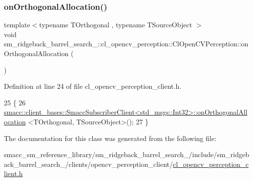 \subsubsection{\texorpdfstring{on\+Orthogonal\+Allocation()}{onOrthogonalAllocation()}}
{\footnotesize\ttfamily template$<$typename T\+Orthogonal , typename T\+Source\+Object $>$ \\
void sm\+\_\+ridgeback\+\_\+barrel\+\_\+search\+\_\+::cl\+\_\+opencv\+\_\+perception\+::\+Cl\+Open\+C\+V\+Perception\+::on\+Orthogonal\+Allocation (\begin{DoxyParamCaption}{ }\end{DoxyParamCaption})\hspace{0.3cm}{\ttfamily [inline]}}



Definition at line 24 of file cl\+\_\+opencv\+\_\+perception\+\_\+client.\+h.


\begin{DoxyCode}
25   \{
26     
      \hyperlink{classsmacc_1_1client__bases_1_1SmaccSubscriberClient}{smacc::client\_bases::SmaccSubscriberClient<std\_msgs::Int32>::onOrthogonalAllocation}
      <TOrthogonal, TSourceObject>();
27   \}
\end{DoxyCode}


The documentation for this class was generated from the following file\+:\begin{DoxyCompactItemize}
\item 
smacc\+\_\+sm\+\_\+reference\+\_\+library/sm\+\_\+ridgeback\+\_\+barrel\+\_\+search\+\_/include/sm\+\_\+ridgeback\+\_\+barrel\+\_\+search\+\_/clients/opencv\+\_\+perception\+\_\+client/\hyperlink{sm__ridgeback__barrel__search__1_2include_2sm__ridgeback__barrel__search__1_2clients_2opencv__peeb5457d7f99e3e3e8b4e825cafa677f7}{cl\+\_\+opencv\+\_\+perception\+\_\+client.\+h}\end{DoxyCompactItemize}
